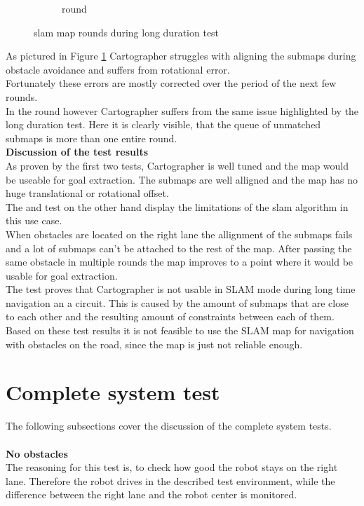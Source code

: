 \begin{figure}[H]
\begin{subfigure}{.3\linewidth}
		\caption{ round}
	\end{subfigure}

	\caption{slam map rounds during long duration test}
	\label{4slamtest}

\end{figure}

As pictured in Figure \ref{4slamtest} Cartographer struggles with aligning the submaps during obstacle avoidance and suffers from rotational error.\\
Fortunately these errors are mostly corrected over the period of the next few rounds.\\ In the  round however Cartographer suffers from the same issue highlighted by the long duration test. Here it is clearly visible, that the queue of unmatched submaps is more than one entire round.\\

\textbf{Discussion of the test results}\\
As proven by the first two tests, Cartographer is well tuned and the map would be useable for goal extraction. The submaps are well alligned and the map has no huge translational or rotational offset.\\

The  and  test on the other hand display the limitations of the slam algorithm in this use case.\\
When obstacles are located on the right lane the allignment of the submaps fails and a lot of submaps can't be attached to the rest of the map. After passing the same obstacle in multiple rounds the map improves to a point where it would be usable for goal extraction.\\
The  test proves that Cartographer is not usable in SLAM mode during long time navigation an a circuit. This is caused by the amount of submaps that are close to each other and the resulting amount of constraints between each of them.\\

Based on these test results it is not feasible to use the SLAM map for navigation with obstacles on the road, since the map is just not reliable enough.




\section{Complete system test}
The following subsections cover the discussion of the complete system tests.\\\\
\textbf{No obstacles}\\
The reasoning for this test is, to check how good the robot stays on the right lane. Therefore the robot drives in the described test environment, while the difference between the right lane and the robot center is monitored.

